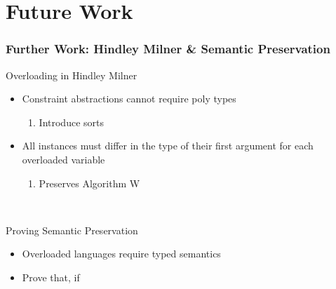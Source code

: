 \documentclass[aspectratio=169]{beamer}
\begin{document}
\section{Future Work}

\begin{frame}[fragile]
  \frametitle{Further Work: Hindley Milner \& Semantic Preservation}
  \begin{block}{Overloading in Hindley Milner}
    \
    \begin{itemize}
      \item Constraint abstractions cannot require poly types
      \begin{enumerate}
        \item Introduce sorts
      \end{enumerate}
      \item All instances must differ in the type of their first argument for each overloaded variable
        \begin{enumerate}
        \item Preserves Algorithm W
      \end{enumerate}
    \end{itemize}
    \
  \end{block}
  \begin{block}{Proving Semantic Preservation}
    \
    \begin{itemize}
      \item Overloaded languages require typed semantics
      \item Prove that, if 
    \end{itemize}
    \
  \end{block}
\end{frame}
\end{document}
